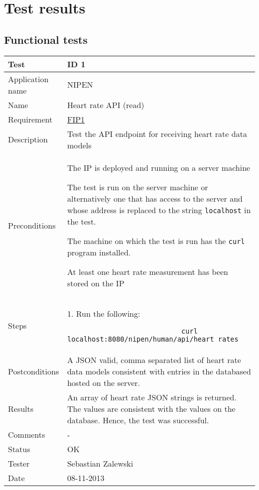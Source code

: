 \chapter{Test results}
\label{AppendixD}

\section{Functional tests}

\begin{table}
\begin{center}
\begin{tabular}{ | l | p{10cm} | }
	\hline
	\textbf{Test}	&	\textbf{ID 1} \\
	\hline\noalign{\smallskip}\noalign{\smallskip}\hline
	Application name	& NIPEN \\
	Name				& Heart rate API (read) \\
	Requirement			& \hyperref[table:reqip]{FIP1} \\
	Description			& Test the API endpoint for receiving heart rate data models \\
	Preconditions		& 	\par The IP is deployed and running on a server machine 
							\par The test is run on the server machine or alternatively
							one that has access to the server and whose address is replaced to the
							string \verb|localhost| in the test.
							\par The machine on which the test is run has the \verb|curl| program installed.
							\par At least one heart rate measurement has been stored on the IP \\
	Steps 				&	1. Run the following:
							\begin{verbatim}
							curl localhost:8080/nipen/human/api/heart_rates
							\end{verbatim}
							\\
	Postconditions		& A JSON valid, comma separated list of heart rate data models consistent with 
							entries in the databased hosted on the server. \\
	Results				& An array of heart rate JSON strings is returned. 
						  The values are consistent with the values on the database. 
						  Hence, the test was successful. \\
	Comments			& - \\
	Status				& OK \\
	Tester				& Sebastian Zalewski \\
	Date				& 08-11-2013 \\
	\hline
\end{tabular}
\end{center}
\end{table}

